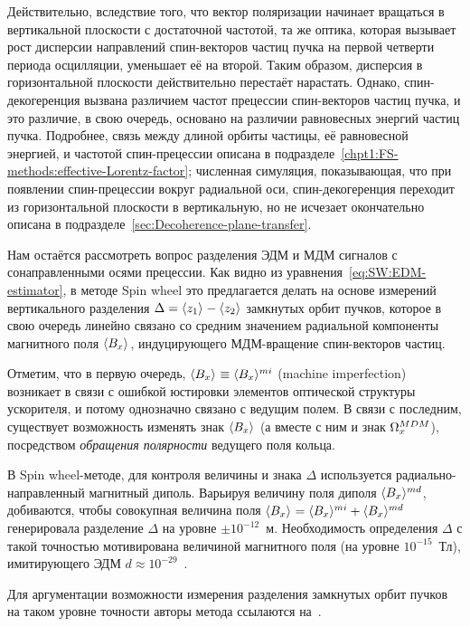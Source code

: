Действительно, вследствие того, что 
вектор поляризации начинает вращаться в вертикальной плоскости с достаточной частотой, та же оптика,
которая вызывает рост дисперсии направлений спин-векторов частиц пучка на первой четверти
 периода осцилляции, уменьшает её на второй. Таким образом, дисперсия в горизонтальной плоскости
 действительно перестаёт нарастать. Однако, спин-декогеренция вызвана различием частот
 прецессии спин-векторов частиц пучка, и это различие, в свою очередь, основано на различии 
 равновесных энергий частиц пучка. Подробнее, связь между длиной орбиты частицы, её равновесной энергией, и частотой спин-прецессии описана в подразделе~\ref{chpt1:FS-methods:effective-Lorentz-factor};
 численная симуляция, показывающая, что при появлении спин-прецессии вокруг радиальной оси, 
 спин-декогеренция переходит из горизонтальной плоскости в вертикальную, но не исчезает окончательно
 описана в подразделе~\ref{sec:Decoherence-plane-transfer}.
 
Нам остаётся рассмотреть вопрос разделения ЭДМ и МДМ сигналов с сонаправленными осями прецессии.
Как видно из уравнения~\eqref{eq:SW:EDM-estimator}, в методе Spin wheel это предлагается делать 
на основе измерений вертикального разделения $\Delta = \avg{z_1} - \avg{z_2}$ замкнутых орбит пучков,
которое в свою очередь линейно связано со средним значением радиальной компоненты магнитного поля
$\avg{B_x}$, индуцирующего МДМ-вращение спин-векторов частиц. 

Отметим, что в первую очередь, $\avg{B_x} \equiv \avg{B_x}^{mi}$ (machine imperfection) возникает в связи 
с ошибкой юстировки элементов оптической структуры ускорителя, и потому 
однозначно связано с ведущим полем. 
В связи с последним, существует возможность изменять знак $\avg{B_x}$ 
(а вместе с ним и знак $\Omega_x^{MDM}$), посредством \emph{обращения полярности} ведущего поля кольца.

В Spin wheel-методе, для контроля величины и знака $\Delta$ используется радиально-направленный
магнитный диполь. Варьируя величину поля диполя $\avg{B_x}^{md}$, добиваются, чтобы совокупная величина 
поля ${\avg{B_x} = \avg{B_x}^{mi} + \avg{B_x}^{md}}$ генерировала разделение $\Delta$ на уровне 
$\pm 10^{-12}$~м. Необходимость определения $\Delta$ с такой точностью мотивирована
величиной магнитного поля (на уровне $10^{-15}$~Тл), имитирующего ЭДМ ${d\approx 10^{-29}}$~\ecm.

Для аргументации возможности измерения разделения замкнутых орбит пучков на таком уровне точности
авторы метода ссылаются на~\cite{Kawall:BPM}. 


